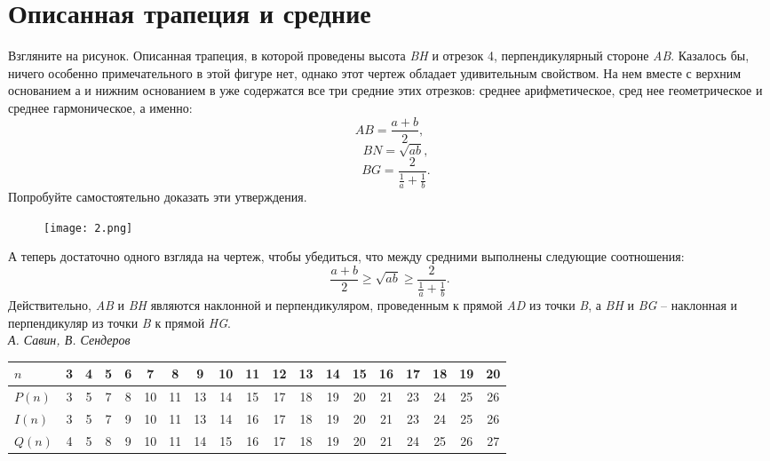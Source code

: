 \documentclass[a4paper, 11pt]{article}
\begin{document}
    \indent
    \begin{minipage}[t]{0.3\textwidth} %
        \titleformat{\section}{\filcenter\Large\bfseries}{}{}{}
        \section*{Описанная трапеция и средние}
        Взгляните на рисунок. Описанная трапеция, в которой проведены высота \textit{BH} и отрезок 4, перпендикулярный стороне \textit{AB}. Казалось бы, ничего особенно примечательного в этой фигуре нет, однако этот чертеж обладает удивительным свойством. На нем вместе с верхним основанием а и нижним основанием в уже содержатся все три средние этих отрезков: среднее арифметическое, сред нее геометрическое и среднее гармоническое, а именно:\[AB = \frac{a+b}{2},\] \[\quad BN = \sqrt{ab},\] \[\quad BG = \frac{2}{\frac{1}{a}+\frac{1}{b}}.\]
        Попробуйте самостоятельно доказать эти утверждения.
        \begin{figure}[H]
            \setcounter{figure}{13}
            \centering
            \texttt{[image: 2.png]}
        \end{figure}
        А теперь достаточно одного взгляда на чертеж, чтобы убедиться, что между средними выполнены следующие соотношения:
        \[ \frac{a+b}{2} \geq \sqrt{ab} \geq \frac{2}{\frac{1}{a}+\frac{1}{b}}.\]
        Действительно, \textit{AB} и \textit{BH} являются наклонной и перпендикуляром, проведенным к прямой \textit{AD} из точки \textit{B}, а \textit{BH} и \textit{BG} -- наклонная и перпендикуляр из точки \textit{B} к прямой \textit{HG}.\\

        {\textit{А. Савин, В. Сендеров}}\raggedleft
    \end{minipage}
    \begin{center}
        \begin{tabular}{|l|c|c|c|c|c|c|c|c|c|c|c|c|c|c|c|c|c|c|}
            \hline
            $n$ & 3 & 4 & 5 & 6 & 7 & 8 & 9 & 10 & 11 & 12 & 13 & 14 & 15 & 16 & 17 & 18 & 19 & 20  \\
            \hline
            $P(n)$ & 3  & 5 & 7 & 8 & 10 & 11 & 13 & 14 & 15 & 17 & 18 & 19 & 20 & 21 & 23 & 24 & 25 & 26 \\
            \hline
            $I(n)$ & 3  & 5 & 7 & 9 & 10 & 11 & 13 & 14 & 16 & 17 & 18 & 19 & 20 & 21 & 23 & 24 & 25 & 26 \\
            \hline
            $Q(n)$ & 4  & 5 & 8 & 9 & 10 & 11 & 14 & 15 & 16 & 17 & 18 & 19 & 20 & 21 & 24 & 25 & 26 & 27 \\
            \hline
        \end{tabular}
    \end{center}
\end{document}
